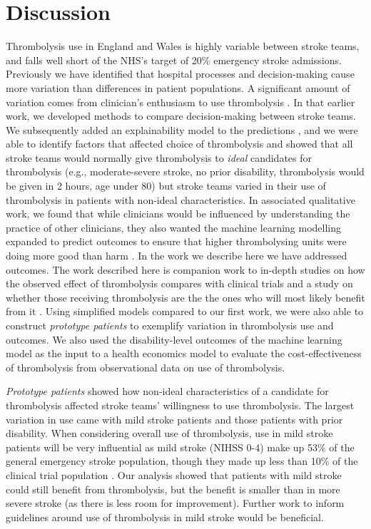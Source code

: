 \section{Discussion}

Thrombolysis use in England and Wales is highly variable between stroke teams, and falls well short of the NHS's target of 20\% emergency stroke admissions. Previously we have identified that hospital processes and decision-making cause more variation than differences in patient populations. A significant amount of variation comes from clinician's enthusiasm to use thrombolysis \cite{allen_use_2022, allen_using_2022}. In that earlier work, we developed methods to compare decision-making between stroke teams. We subsequently added an explainability model to the predictions \cite{pearn_what_2023}, and we were able to identify factors that affected choice of thrombolysis and showed that all stroke teams would normally give thrombolysis to \textit{ideal} candidates for thrombolysis (e.g., moderate-severe stroke, no prior disability, thrombolysis would be given in 2 hours, age under 80) but stroke teams varied in their use of thrombolysis in patients with non-ideal characteristics. In associated qualitative work, we found that while clinicians would be influenced by understanding the practice of other clinicians, they also wanted the machine learning modelling expanded to predict outcomes to ensure that higher thrombolysing units were doing more good than harm \cite{allen_using_2022}. In the work we describe here we have addressed outcomes. The work described here is companion work to in-depth studies on how the observed effect of thrombolysis compares with clinical trials \cite{pearn_thrombolysis_2024} and a study on whether those receiving thrombolysis are the the ones who will most likely benefit from it \cite{pearn_are_2024}. Using simplified models compared to our first work, we were also able to construct \textit{prototype patients} to exemplify variation in thrombolysis use and outcomes. We also used the disability-level outcomes of the machine learning model as the input to a health economics model to evaluate the cost-effectiveness of thrombolysis from observational data on use of thrombolysis.

\textit{Prototype patients} showed how non-ideal characteristics of a candidate for thrombolysis affected stroke teams' willingness to use thrombolysis. The largest variation in use came with mild stroke patients and those patients with prior disability. When considering overall use of thrombolysis, use in mild stroke patients will be very influential as mild stroke (NIHSS 0-4) make up 53\% of the general emergency stroke population, though they made up less than 10\% of the clinical trial population \cite{emberson_effect_2014}. Our analysis showed that patients with mild stroke could still benefit from thrombolysis, but the benefit is smaller than in more severe stroke (as there is less room for improvement). Further work to inform guidelines around use of thrombolysis in mild stroke would be beneficial.

